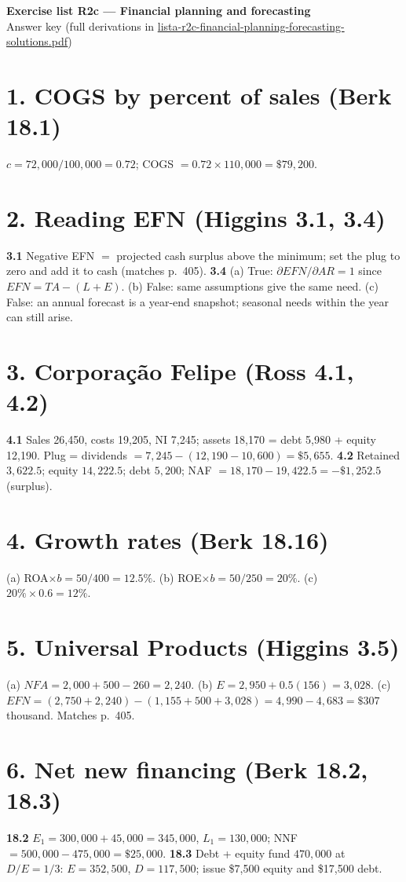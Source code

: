 \documentclass[11pt,a4paper]{article}
\newcommand{\EFN}{\mathit{EFN}}
\begin{document}
\begin{center}{\Large\bfseries Exercise list R2c --- Financial planning and forecasting}\\[4pt]{\large Answer key (full derivations in \url{lista-r2c-financial-planning-forecasting-solutions.pdf})}\end{center}

\section*{1. COGS by percent of sales (Berk 18.1)}
$c=72{,}000/100{,}000=0.72$; COGS $=0.72\times110{,}000=\$79{,}200$.

\section*{2. Reading EFN (Higgins 3.1, 3.4)}
\textbf{3.1} Negative EFN $=$ projected cash surplus above the minimum; set the plug to zero and add it to
cash (matches p.~405). \textbf{3.4} (a) True: $\partial\EFN/\partial AR=1$ since $\EFN=TA-(L+E)$.
(b) False: same assumptions give the same need. (c) False: an annual forecast is a year-end snapshot;
seasonal needs within the year can still arise.

\section*{3. Corpora\c{c}\~ao Felipe (Ross 4.1, 4.2)}
\textbf{4.1} Sales 26,450, costs 19,205, NI 7,245; assets 18,170 = debt 5,980 + equity 12,190. Plug = dividends
$=7{,}245-(12{,}190-10{,}600)=\$5{,}655$. \textbf{4.2} Retained $3{,}622.5$; equity $14{,}222.5$; debt $5{,}200$;
NAF $=18{,}170-19{,}422.5=-\$1{,}252.5$ (surplus).

\section*{4. Growth rates (Berk 18.16)}
(a) ROA$\times b=50/400=12.5\%$. (b) ROE$\times b=50/250=20\%$. (c) $20\%\times0.6=12\%$.

\section*{5. Universal Products (Higgins 3.5)}
(a) $NFA=2{,}000+500-260=2{,}240$. (b) $E=2{,}950+0.5(156)=3{,}028$. (c) $\EFN=(2{,}750+2{,}240)-(1{,}155+500+3{,}028)=4{,}990-4{,}683=\$307$ thousand. Matches p.~405.

\section*{6. Net new financing (Berk 18.2, 18.3)}
\textbf{18.2} $E_1=300{,}000+45{,}000=345{,}000$, $L_1=130{,}000$; NNF $=500{,}000-475{,}000=\$25{,}000$.
\textbf{18.3} Debt + equity fund $470{,}000$ at $D/E=1/3$: $E=352{,}500$, $D=117{,}500$; issue \$7,500 equity and \$17,500 debt.
\end{document}
